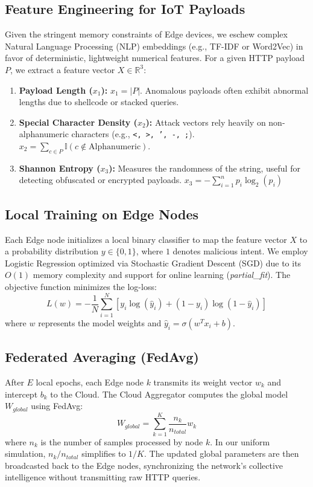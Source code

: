 \documentclass[conference]{IEEEtran}
\begin{document}
\subsection{Feature Engineering for IoT Payloads}
Given the stringent memory constraints of Edge devices, we eschew complex Natural Language Processing (NLP) embeddings (e.g., TF-IDF or Word2Vec) in favor of deterministic, lightweight numerical features. For a given HTTP payload $P$, we extract a feature vector $X \in \mathbb{R}^3$:
\begin{enumerate}
    \item \textbf{Payload Length ($x_1$):} $x_1 = |P|$. Anomalous payloads often exhibit abnormal lengths due to shellcode or stacked queries.
    \item \textbf{Special Character Density ($x_2$):} Attack vectors rely heavily on non-alphanumeric characters (e.g., \texttt{<, >, ', -, ;}). $x_2 = \sum_{c \in P} \mathbb{I}(c \notin \text{Alphanumeric})$.
    \item \textbf{Shannon Entropy ($x_3$):} Measures the randomness of the string, useful for detecting obfuscated or encrypted payloads. 
    $x_3 = - \sum_{i=1}^{n} p_i \log_2(p_i)$
\end{enumerate}

\subsection{Local Training on Edge Nodes}
Each Edge node initializes a local binary classifier to map the feature vector $X$ to a probability distribution $y \in \{0, 1\}$, where $1$ denotes malicious intent. We employ Logistic Regression optimized via Stochastic Gradient Descent (SGD) due to its $O(1)$ memory complexity and support for online learning (\textit{partial\_fit}).
The objective function minimizes the log-loss:
\begin{equation}
    L(w) = - \frac{1}{N} \sum_{i=1}^{N} \left[ y_i \log(\hat{y}_i) + (1-y_i) \log(1-\hat{y}_i) \right]
\end{equation}
where $w$ represents the model weights and $\hat{y}_i = \sigma(w^T x_i + b)$.

\subsection{Federated Averaging (FedAvg)}
After $E$ local epochs, each Edge node $k$ transmits its weight vector $w_k$ and intercept $b_k$ to the Cloud. The Cloud Aggregator computes the global model $W_{global}$ using FedAvg:
\begin{equation}
    W_{global} = \sum_{k=1}^{K} \frac{n_k}{n_{total}} w_k
\end{equation}
where $n_k$ is the number of samples processed by node $k$. In our uniform simulation, $n_k / n_{total}$ simplifies to $1/K$. The updated global parameters are then broadcasted back to the Edge nodes, synchronizing the network's collective intelligence without transmitting raw HTTP queries.
\end{document}
